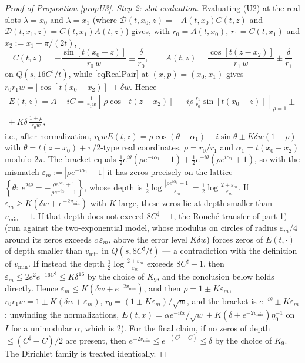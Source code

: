 \documentclass[11pt,twoside,reqno]{amsart}
\def\e{\varepsilon}
\def\d{\delta}
\def\l{\lambda}
\def\a{\alpha}
\theoremstyle{plain}
\numberwithin{equation}{section}
\begin{document}
\begin{proof}[Proof of Proposition \ref{propU3}]
{\it Step 2: slot evaluation.} Evaluating (U2) at the real slots $\l=x_0$ and $\l=x_1$ (where ${\mathcal D}(t,x_0,z)=-A(t,x_0)C(t,z)$ and ${\mathcal D}(t,x_1,z)=C(t,x_1)A(t,z)$) gives, with $r_0=A(t,x_0)$, $r_1=C(t,x_1)$ and $x_2:=x_1-\pi/(2t)$,
$$C(t,z)=-\frac{\sin[t(x_0-z)]}{r_0\,w}\pm\frac{\d}{r_0},\qquad
A(t,z)=\frac{\cos[t(z-x_2)]}{r_1\,w}\pm\frac{\d}{r_1}$$
on $Q(s,16C^\sharp/t)$, while \eqref{eqRealPair} at $(x,p)=(x_0,x_1)$ gives $r_0r_1w=|\cos[t(x_0-x_2)]|\pm\d w$. Hence
$$\begin{gathered}E(t,z)=A-iC=\frac{1}{r_1w}\left[\,\rho\cos[t(z-x_2)]\,+\,i\rho\,\frac{r_1}{r_0}\sin[t(x_0-z)]\,\right]_{\rho=1}\pm\\ \pm\ K\d\,\frac{1+\rho}{r_0w},\end{gathered}$$
i.e., after normalization, $r_0wE(t,z)=\rho\cos(\theta-\a_1)-i\sin\theta\pm K\d w(1+\rho)$ with $\theta=t(z-x_0)+\pi/2$-type real coordinates, $\rho=r_0/r_1$ and $\a_1=t(x_0-x_2)$ modulo $2\pi$. The bracket equals $\tfrac12e^{i\theta}\left(\rho e^{-i\a_1}-1\right)+\tfrac12e^{-i\theta}\left(\rho e^{i\a_1}+1\right)$, so with the mismatch $\e_m:=|\rho e^{-i\a_1}-1|$ it has zeros precisely on the lattice $\left\{\theta:\ e^{2i\theta}=-\frac{\rho e^{i\a_1}+1}{\rho e^{-i\a_1}-1}\right\}$, whose depth is $\frac12\log\frac{|\rho e^{i\a_1}+1|}{\e_m}=\frac12\log\frac{2\pm\e_m}{\e_m}$. If $\e_m\geq K(\d w+e^{-2v_{\min}})$ with $K$ large, these zeros lie at depth smaller than $v_{\min}-1$. If that depth does not exceed $8C^\sharp-1$, the Rouch\'e transfer of part 1) (run against the two-exponential model, whose modulus on circles of radius $\e_m/4$ around its zeros exceeds $c\,\e_m$, above the error level $K\d w$) forces zeros of $E(t,\cdot)$ of depth smaller than $v_{\min}$ in $Q(s,8C^\sharp/t)$ --- a contradiction with the definition of $v_{\min}$. If instead the depth $\tfrac12\log\frac{2+\e_m}{\e_m}$ exceeds $8C^\sharp-1$, then $\e_m\leq2e^2e^{-16C^\sharp}\leq K\d^{16}$ by the choice of $K_9$, and the conclusion below holds directly. Hence $\e_m\leq K(\d w+e^{-2v_{\min}})$, and then $\rho=1\pm K\e_m$, $r_0r_1w=1\pm K(\d w+\e_m)$, $r_0=(1\pm K\e_m)/\sqrt w$, and the bracket is $e^{-i\theta}\pm K\e_m$: unwinding the normalizations, $E(t,x)=\a e^{-itx}/\sqrt w\pm K(\d+e^{-2v_{\min}})\eta_0^{-1}$ on $I$ for a unimodular $\a$, which is 2). For the final claim, if no zeros of depth $\leq(C^\sharp-C)/2$ are present, then $e^{-2v_{\min}}\leq e^{-(C^\sharp-C)}\leq\d$ by the choice of $K_9$. The Dirichlet family is treated identically.
\end{proof}
\end{document}

